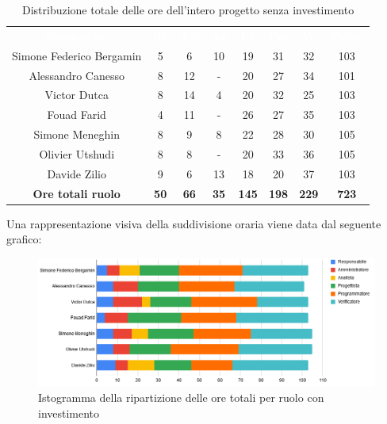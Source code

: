 \begin{table}[H]
\centering\renewcommand{\arraystretch}{1.5}
\caption{Distribuzione totale delle ore dell'intero progetto senza investimento}
\vspace{0.2cm}
\begin{tabular}{ c c c c c c c c }
\rowcolor{redafk}
\textcolor{white}{\textbf{Nominativo}} & \textcolor{white}{\textbf{Re}} & 
\textcolor{white}{\textbf{Am}} & \textcolor{white}{\textbf{An}} &
\textcolor{white}{\textbf{Pt}} & \textcolor{white}{\textbf{Pm}} &
\textcolor{white}{\textbf{Ve}} & \textcolor{white}{\textbf{Totale}} \\
Simone Federico Bergamin 	& 5 	& 6 	& 10	& 19	& 31	& 32 	& 103 \\
Alessandro Canesso 			& 8 	& 12	& - 	& 20	& 27	& 34 	& 101 \\
Victor Dutca 				& 8 	& 14	& 4 	& 20	& 32	& 25 	& 103 \\
Fouad Farid					& 4 	& 11	& - 	& 26	& 27	& 35 	& 103 \\
Simone Meneghin 			& 8 	& 9 	& 8 	& 22	& 28	& 30 	& 105 \\
Olivier Utshudi 			& 8 	& 8 	& - 	& 20	& 33	& 36 	& 105 \\
Davide Zilio 				& 9 	& 6 	& 13	& 18	& 20	& 37 	& 103 \\
\rowcolor{lastrowcolor}
\textbf{Ore totali ruolo} & \textbf{50} & \textbf{66} & \textbf{35} & \textbf{145} & \textbf{198} & \textbf{229} & \textbf{723} \\
\end{tabular}
\end{table}

Una rappresentazione visiva della suddivisione oraria viene data dal seguente grafico:
\begin{figure}[H]
\centering
\includegraphics[scale=0.60]{img/grafici/tabella_tot_no_analisi.png}
\caption{Istogramma della ripartizione delle ore totali per ruolo con investimento}
\end{figure}

